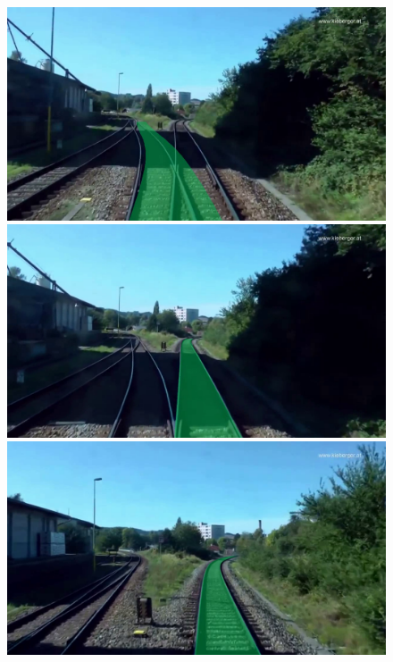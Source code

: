 \begin{figure}[H]
\begin{minipage}{0.16\textwidth}
    \end{minipage}
    \hfill
    \begin{minipage}{0.16\textwidth}
        \includegraphics[width=\textwidth]{PICs/Baselinepaper/limitation_4.png}
    \end{minipage}
    \hfill
    \begin{minipage}{0.16\textwidth}
        \includegraphics[width=\textwidth]{PICs/Baselinepaper/limitation_5.png}
    \end{minipage}
    \hfill
    \begin{minipage}{0.16\textwidth}
        \includegraphics[width=\textwidth]{PICs/Baselinepaper/limitation_6.png}
    \end{minipage}


\end{figure}
